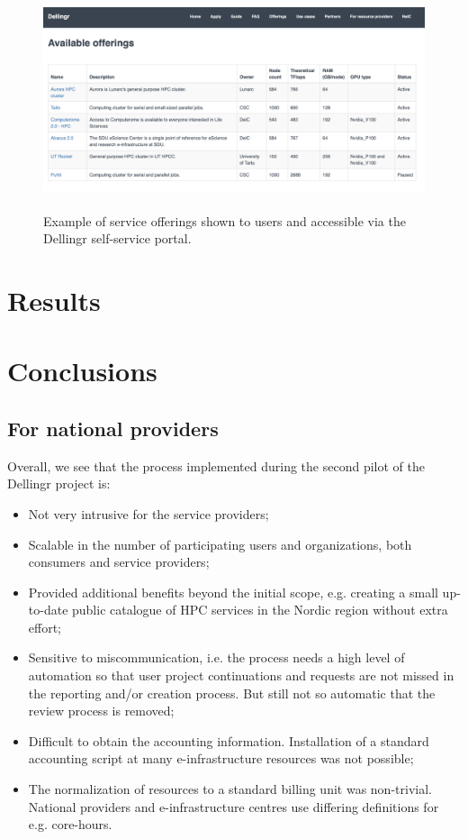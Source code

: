 \documentclass{article}
\newcommand{\dell}{Dellingr\xspace}
\newcommand{\einfra}{e-infrastructure\xspace}
\newcommand{\np}{national provider\xspace}
\newcommand{\nps}{\np{s}\xspace}
\newcommand{\coreh}{core-hours\xspace}
\begin{document}
\begin{figure}
\centering
\includegraphics[height=180pt]{Dellingr-list-of-resource.png}
\caption{Example of service offerings shown to users and accessible via the \dell self-service portal.}
\label{fig:offerings}
\end{figure}

\section{Results}
\label{sec:results}


\section{Conclusions}

\subsection{For \nps}

Overall, we see that the process implemented during the second pilot of the \dell project is:
\begin{itemize}
\item Not very intrusive for the service providers;
\item Scalable in the number of participating users and organizations, both consumers and service providers;
\item Provided additional benefits beyond the initial scope, e.g. creating a small up-to-date public catalogue of HPC services in the Nordic region without extra effort;
\item {Sensitive to miscommunication, i.e. the process needs a high level of automation so that user project continuations and requests are not missed in the reporting and/or creation process. But still not so automatic that the review process is removed;}
\item {Difficult to obtain the accounting information. Installation of a standard accounting script at many \einfra resources was not possible;}
\item{The normalization of resources to a standard billing unit was non-trivial. 
National providers and \einfra centres use differing definitions for e.g. \coreh.}
\end{itemize} 
\end{document}
